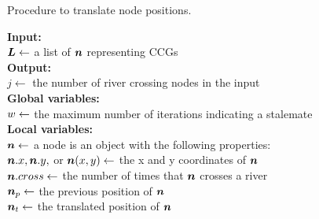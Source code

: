 \begin{algorithm}[tb!]
    \caption{Procedure to translate node positions.}\label{alg:TranslateNode}

    \textbf{Input:} \\
    $ \bm{L} \gets $ a list of $ \bm{n} $ representing CCGs \\

    \textbf{Output:} \\
    $ j \gets $ the number of river crossing nodes in the input \\

    \textbf{Global variables:} \\
    $ w \gets $ the maximum number of iterations indicating a stalemate \\

    \textbf{Local variables:} \\
    $ \bm{n} \gets $ a node is an object with the following properties: \\
    \-\hspace{1em} $ \bm{n}.x, \bm{n}.y, $ or $ \bm{n}(x,y) \gets $ the x and y coordinates of $ \bm{n} $ \\
    \-\hspace{1em} $ \bm{n}.cross \gets $ the number of times that $ \bm{n} $ crosses a river  \\
    \-\hspace{1em} $ \bm{n}_{p} \gets $ the previous position of $ \bm{n} $ \\
    \-\hspace{1em} $ \bm{n}_t \gets $ the translated position of $ \bm{n} $ \\

\end{algorithm}


